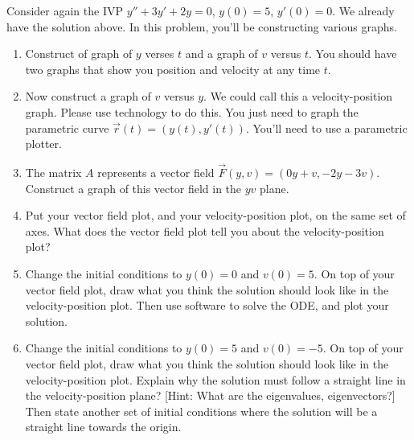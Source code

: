 \begin{problem}
Consider again the IVP $y''+3y'+2y=0$, $y(0)=5$, $y'(0)=0$.  We already have the solution above. In this problem, you'll be constructing various graphs. 
\begin{enumerate}
\item {}%
Construct of graph of $y$ verses $t$ and a graph of $v$ versus $t$. You should have two graphs that show you position and velocity at any time $t$.  
\item Now construct a graph of $v$ versus $y$.  We could call this a velocity-position graph. Please use technology to do this.  You just need to graph the parametric curve $\vec r(t) = (y(t), y'(t))$. You'll need to use a parametric plotter. 
\item The matrix $A$ represents a vector field $\vec F(y,v) = (0y+v, -2y-3v)$. Construct a graph of this vector field in the $yv$ plane.
\item Put your vector field plot, and your velocity-position plot, on the same set of axes.  What does the vector field plot tell you about the velocity-position plot?
\item {}%
Change the initial conditions to $y(0)=0$ and $v(0)=5$.  On top of your vector field plot, draw what you think the solution should look like in the velocity-position plot. Then use software to solve the ODE, and plot your solution.
\item Change the initial conditions to $y(0)=5$ and $v(0)=-5$.  On top of your vector field plot, draw what you think the solution should look like in the velocity-position plot. Explain why the solution must follow a straight line in the velocity-position plane?  [Hint: What are the eigenvalues, eigenvectors?]  Then state another set of initial conditions where the solution will be a straight line towards the origin.
\end{enumerate}

\end{problem}

